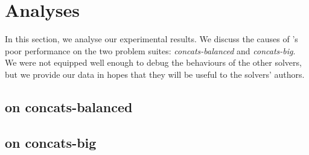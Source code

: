 \section{Analyses}
\label{sec:analysis}

    In this section, we analyse our experimental results. We discuss the causes of \us{}'s poor performance on the two problem suites: \textit{concats-balanced} and \textit{concats-big}. We were not equipped well enough to debug the behaviours of the other solvers, but we provide our data in hopes that they will be useful to the solvers' authors.

    \subsection{\us{} on concats-balanced}



    \subsection{\us{} on concats-big}


